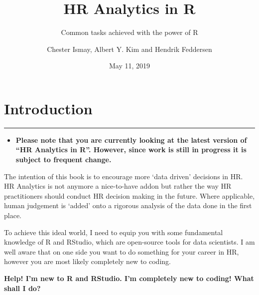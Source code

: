 \documentclass[
  12pt, krantz2,
]{krantz}
\title{HR Analytics in R}
\subtitle{Common tasks achieved with the power of R}
\author{Chester Ismay, Albert Y. Kim and Hendrik Feddersen}
\date{May 11, 2019}
\newenvironment{rmdblock}[1]
  {\begin{shaded*}
  \begin{itemize}
  \renewcommand{\labelitemi}{
    \raisebox{-.7\height}[0pt][0pt]{
    }
  }
  \item
  }
  {
  \end{itemize}
  \end{shaded*}
  }
\newenvironment{learncheck}
  {\begin{rmdblock}{warning}}
  {\end{rmdblock}}
\begin{document}
\maketitle


\thispagestyle{empty}

\begin{center}
\end{center}

\setlength{\abovedisplayskip}{-5pt}
\setlength{\abovedisplayshortskip}{-5pt}

{
\hypersetup{linkcolor=}
\setcounter{tocdepth}{2}
\tableofcontents
}
\listoftables
\listoffigures
\mainmatter

\hypertarget{intro}{%
\chapter{Introduction}\label{intro}}

\begin{center}\rule{0.5\linewidth}{\linethickness}\end{center}

\begin{learncheck}
\textbf{Please note that you are currently looking at the latest version
of ``HR Analytics in R''. However, since work is still in progress it is
subject to frequent change.}
\end{learncheck}

The intention of this book is to encourage more `data driven' decisions in HR. HR Analytics is not anymore a nice-to-have addon but rather the way HR practitioners should conduct HR decision making in the future. Where applicable, human judgement is `added' onto a rigorous analysis of the data done in the first place.

To achieve this ideal world, I need to equip you with some fundamental knowledge of R and RStudio, which are open-source tools for data scientists. I am well aware that on one side you want to do something for your career in HR, however you are most likely completely new to coding.

\textbf{Help! I'm new to R and RStudio. I'm completely new to coding! What shall I do?}
\end{document}
